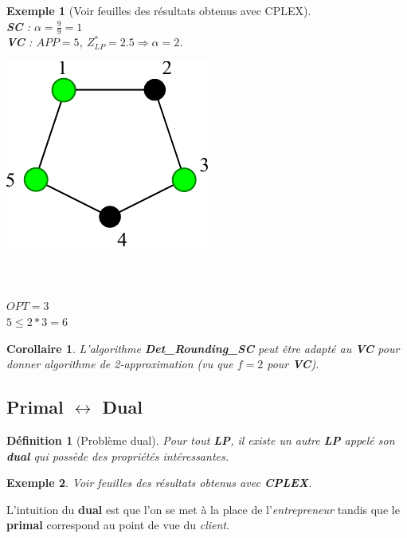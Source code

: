 \documentclass{article}
\newcommand{\titre}[1]{\textcolor{title}{#1}}
\newtheorem{de}{D\'efinition}[section]
\newtheorem{exemple}{Exemple}[section]
\newtheorem{corollaire}{Corollaire}[section]
\begin{document}
\begin{sffamily}
\begin{exemple}[Voir feuilles des résultats obtenus avec CPLEX]$ $\\
\textbf{\titre{SC}} : $\alpha = \frac{9}{9} = 1$ \\
\textbf{\titre{VC}} : $APP = 5$, $Z^*_{LP} = 2.5 \Rightarrow \alpha = 2$. \\
\begin{multicols}{2}
\includegraphics[scale=1]{vcSol.pdf}
$ $\\$ $\\$ $\\$ $\\
$OPT = 3$\\
$5 \leq 2*3=6$
\end{multicols}
\end{exemple}

\begin{corollaire}
L'algorithme \textbf{Det\_Rounding\_SC} peut être adapté au \textbf{\titre{VC}}
pour donner algorithme de 2-approximation (vu que $f = 2$ pour
\textbf{\titre{VC}}).
\end{corollaire}

\subsection{Primal $\leftrightarrow$ Dual}

\begin{de}[Problème dual]
Pour tout \textbf{\titre{LP}}, il existe un autre \textbf{\titre{LP}} appelé son
\textbf{dual} qui possède des propriétés intéressantes.
\end{de}

\begin{exemple}
Voir feuilles des résultats obtenus avec \textbf{CPLEX}.
\end{exemple}

L'intuition du \textbf{dual} est que l'on se met à la place de
l'\textit{entrepreneur} tandis que le \textbf{primal} correspond au point de vue
du \textit{client}. \\


\end{sffamily}
\end{document}
